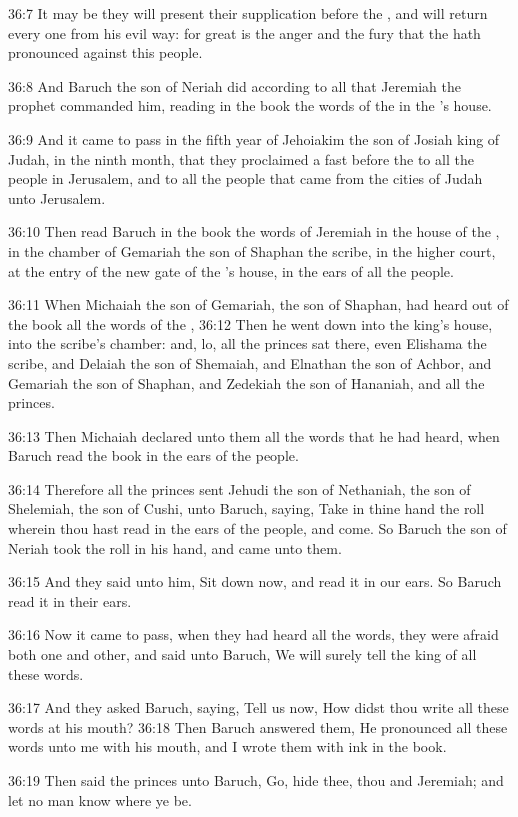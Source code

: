 36:7 It may be they will present their supplication before the \LORD,
and will return every one from his evil way: for great is the anger
and the fury that the \LORD hath pronounced against this people.

36:8 And Baruch the son of Neriah did according to all that Jeremiah
the prophet commanded him, reading in the book the words of the \LORD
in the \LORD's house.

36:9 And it came to pass in the fifth year of Jehoiakim the son of
Josiah king of Judah, in the ninth month, that they proclaimed a fast
before the \LORD to all the people in Jerusalem, and to all the people
that came from the cities of Judah unto Jerusalem.

36:10 Then read Baruch in the book the words of Jeremiah in the house
of the \LORD, in the chamber of Gemariah the son of Shaphan the scribe,
in the higher court, at the entry of the new gate of the \LORD's house,
in the ears of all the people.

36:11 When Michaiah the son of Gemariah, the son of Shaphan, had heard
out of the book all the words of the \LORD, 36:12 Then he went down
into the king's house, into the scribe's chamber: and, lo, all the
princes sat there, even Elishama the scribe, and Delaiah the son of
Shemaiah, and Elnathan the son of Achbor, and Gemariah the son of
Shaphan, and Zedekiah the son of Hananiah, and all the princes.

36:13 Then Michaiah declared unto them all the words that he had
heard, when Baruch read the book in the ears of the people.

36:14 Therefore all the princes sent Jehudi the son of Nethaniah, the
son of Shelemiah, the son of Cushi, unto Baruch, saying, Take in thine
hand the roll wherein thou hast read in the ears of the people, and
come. So Baruch the son of Neriah took the roll in his hand, and came
unto them.

36:15 And they said unto him, Sit down now, and read it in our ears.
So Baruch read it in their ears.

36:16 Now it came to pass, when they had heard all the words, they
were afraid both one and other, and said unto Baruch, We will surely
tell the king of all these words.

36:17 And they asked Baruch, saying, Tell us now, How didst thou write
all these words at his mouth?  36:18 Then Baruch answered them, He
pronounced all these words unto me with his mouth, and I wrote them
with ink in the book.

36:19 Then said the princes unto Baruch, Go, hide thee, thou and
Jeremiah; and let no man know where ye be.

